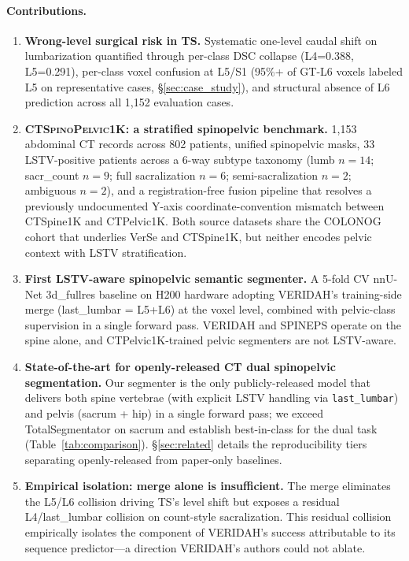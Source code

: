 \documentclass{article}
\newcommand{\dataset}{\textsc{CTSpinoPelvic1K}}
\newcommand{\TS}{TotalSegmentator}
\newcommand{\sota}{TS}
\newcommand{\VERIDAH}{VERIDAH}
\newcommand{\VerSe}{VerSe}
\begin{document}
\paragraph{Contributions.}
\begin{enumerate}
\item \textbf{Wrong-level surgical risk in \sota{}.}
  Systematic one-level caudal shift on lumbarization
  quantified through per-class DSC collapse (L4=0.388,
  L5=0.291), per-class voxel confusion at L5/S1
  (95\%+ of GT-L6 voxels labeled L5 on representative
  cases, \S\ref{sec:case_study}), and structural absence of
  L6 prediction across all 1{,}152 evaluation cases.
\item \textbf{\dataset{}: a stratified spinopelvic
  benchmark.} 1{,}153 abdominal CT records across 802
  patients, unified spinopelvic masks, 33 LSTV-positive
  patients across a 6-way subtype taxonomy
  (lumb $n=14$; sacr\_count $n=9$; full sacralization
  $n=6$; semi-sacralization $n=2$; ambiguous $n=2$), and a
  registration-free fusion pipeline that resolves a
  previously undocumented Y-axis coordinate-convention
  mismatch between CTSpine1K and CTPelvic1K. Both source
  datasets share the COLONOG cohort that underlies
  \VerSe{} and CTSpine1K, but neither encodes pelvic
  context with LSTV stratification.
\item \textbf{First LSTV-aware spinopelvic semantic
  segmenter.} A 5-fold CV nnU-Net 3d\_fullres baseline on
  H200 hardware adopting \VERIDAH{}'s training-side merge
  (last\_lumbar = L5+L6) at the voxel level, combined with
  pelvic-class supervision in a single forward pass.
  \VERIDAH{} and SPINEPS operate on the spine alone, and
  CTPelvic1K-trained pelvic segmenters are not LSTV-aware.
\item \textbf{State-of-the-art for openly-released CT
  dual spinopelvic segmentation.} Our segmenter is the
  only publicly-released model that delivers both spine
  vertebrae (with explicit LSTV handling via
  \texttt{last\_lumbar}) and pelvis (sacrum + hip) in a
  single forward pass; we exceed \TS{} on sacrum and
  establish best-in-class for the dual task
  (Table~\ref{tab:comparison}). \S\ref{sec:related}
  details the reproducibility tiers separating openly-released
  from paper-only baselines.
\item \textbf{Empirical isolation: merge alone is
  insufficient.} The merge eliminates the L5/L6 collision
  driving \sota{}'s level shift but exposes a residual
  L4/last\_lumbar collision on count-style sacralization.
  This residual collision empirically isolates the
  component of \VERIDAH{}'s success attributable to its
  sequence predictor---a direction \VERIDAH{}'s authors
  could not ablate.
\end{enumerate}
\end{document}

